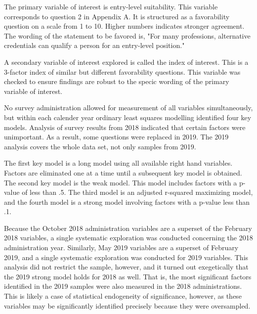 \documentclass[AER]{./aea-latex-templates/AEA}
\begin{document}
        The primary variable of interest is entry-level suitability.
        This variable corresponds to question 2 in Appendix A.
        It is structured as a favorability question on a scale from 1 to 10. Higher numbers indicates stronger agreement.
        The wording of the statement to be favored is, "For many professions, alternative credentials can qualify a person for an entry-level position."
        
        A secondary variable of interest explored is called the index of interest.
        This is a 3-factor index of similar but different favorability questions.
        This variable was checked to ensure findings are robust to the specic wording of the primary variable of interest.
        
        No survey administration allowed for measurement of all variables simultaneously,
        but within each calender year ordinary least squares modelling identified four key models.
        Analysis of survey results from 2018 indicated that certain factors were unimportant.
        As a result, some questions were replaced in 2019. The 2019 analysis covers the whole data
        set, not only samples from 2019.
        
        The first key model is a long model using all available right hand variables.
        Factors are eliminated one at a time until a subsequent key model is obtained.
        The second key model is the weak model. This model includes factors with a p-value of less than .5.
        The third model is an adjusted r-squared maximizing model, and the fourth
        model is a strong model involving factors with a p-value less than .1.
        
        Because the October 2018 administration variables are a superset of the
        February 2018 variables, a single systematic exploration was conducted
        concerning the 2018 administration year. Similarly, May 2019 variables are
        a superset of February 2019, and a single systematic exploration was
        conducted for 2019 variables. This analysis did not restrict the sample,
        however, and it turned out exegetically that the 2019 strong model holds
        for 2018 as well. That is, the most significant factors identified in the
        2019 samples were also measured in the 2018 administrations. This is
        likely a case of statistical endogeneity of significance, however, as
        these variables may be significantly identified precisely because they
        were oversampled.
        
\end{document}
